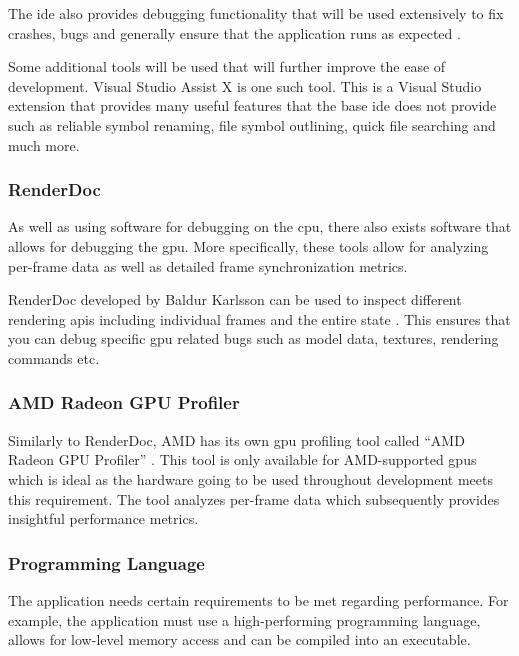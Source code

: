 \documentclass[11pt]{article}
\begin{document}
The \gls*{ide} also provides debugging functionality that will be used
extensively to fix crashes, bugs and generally ensure that the application
runs as expected \cite{visualstudio}. 

Some additional tools will be used that will further improve the ease of
development.  Visual Studio Assist X \cite{visualstudioassistx} is one such
tool. This is a Visual Studio extension that provides many useful features that
the base \gls*{ide} does not provide such as reliable symbol renaming, file symbol
outlining, quick file searching and much more.


\subsubsection{RenderDoc}
As well as using software for debugging on the \gls*{cpu}, there also exists
software that allows for debugging the \gls*{gpu}. More specifically, these tools
allow for analyzing per-frame data as well as detailed frame synchronization
metrics.

RenderDoc developed by Baldur Karlsson can be used to inspect different
rendering \glspl*{api} including individual frames and the entire state
\cite{renderdoc}. This ensures that you can debug specific \gls*{gpu} related
bugs such as model data, textures, rendering commands etc.


\subsubsection{AMD Radeon GPU Profiler}
Similarly to RenderDoc, AMD has its own \gls*{gpu} profiling tool called ``AMD
Radeon GPU Profiler'' \cite{rgp}. This tool is only available for AMD-supported
\glspl*{gpu} which is ideal as the hardware going to be used throughout
development meets this requirement. The tool analyzes per-frame data which
subsequently provides insightful performance metrics.



\subsubsection{Programming Language}
The application needs certain requirements to be met regarding performance. For
example, the application must use a high-performing programming language, allows
for low-level memory access and can be compiled into an executable.
\end{document}
